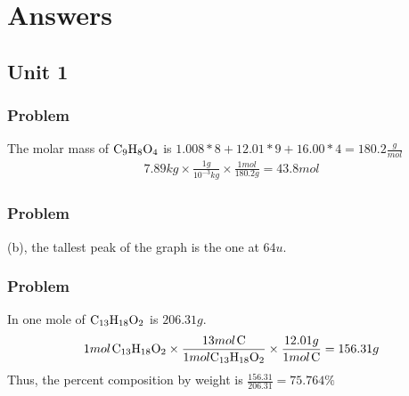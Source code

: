 \documentclass{article}
\begin{document}
\setcounter{yayCounter}{1}
\newpage
\section{Answers}
\subsection{Unit 1}
\subsubsection*{Problem \countThis}
The molar mass of \(\ce{C_9H_8O_4}\) is \(1.008*8 + 12.01*9 + 16.00*4 = 180.2 \frac{g}{mol}\)
\begin{equation}
\begin{aligned}
    7.89kg \times \frac{1g}{10^{-3}kg} \times \frac{1mol}{180.2g} = 43.8mol
\end{aligned}
\end{equation}
\subsubsection*{Problem \countThis}
(b), the tallest peak of the graph is the one at \(64u\). 
\subsubsection*{Problem \countThis}
In one mole of \(\ce{C_{13}H_{18}O_2}\) is \(206.31g\).
\begin{equation}
\begin{aligned}
    1mol\hspace{0.1em}\ce{C_{13}H_{18}O_2} \times \frac{13mol\hspace{0.1em}\ce{C}}{1mol\ce{C_{13}H_{18}O_2}} \times \frac{12.01g}{1mol\hspace{0.1em}\ce{C}} = 156.31g
\end{aligned}
\end{equation}
Thus, the percent composition by weight is \(\frac{156.31}{206.31} = 75.764\%\)
\end{document}

